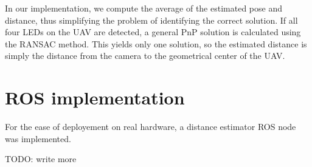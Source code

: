 In our implementation, we compute the average of the estimated pose and distance, thus simplifying the problem of identifying the correct solution. If all four \ac{LED}s on the \ac{UAV} are detected, a general \ac{PnP} solution is calculated using the \ac{RANSAC} method. This yields only one solution, so the
estimated distance is simply the distance from the camera to the geometrical center of the \ac{UAV}.

\section{ROS implementation}
For the ease of deployement on real hardware, a distance estimator ROS node was implemented.

TODO: write more


